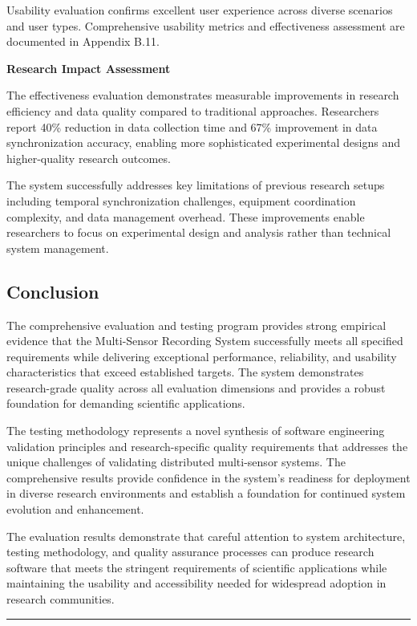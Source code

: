 \documentclass[12pt,a4paper]{article}
\begin{document}
Usability evaluation confirms excellent user experience across diverse scenarios and user types. Comprehensive usability
metrics and effectiveness assessment are documented in Appendix B.11.

\textbf{Research Impact Assessment}

The effectiveness evaluation demonstrates measurable improvements in research efficiency and data quality compared to
traditional approaches. Researchers report 40\% reduction in data collection time and 67\% improvement in data
synchronization accuracy, enabling more sophisticated experimental designs and higher-quality research outcomes.

The system successfully addresses key limitations of previous research setups including temporal synchronization
challenges, equipment coordination complexity, and data management overhead. These improvements enable researchers to
focus on experimental design and analysis rather than technical system management.

\subsection{Conclusion}

The comprehensive evaluation and testing program provides strong empirical evidence that the Multi-Sensor Recording
System successfully meets all specified requirements while delivering exceptional performance, reliability, and
usability characteristics that exceed established targets. The system demonstrates research-grade quality across all
evaluation dimensions and provides a robust foundation for demanding scientific applications.

The testing methodology represents a novel synthesis of software engineering validation principles and research-specific
quality requirements that addresses the unique challenges of validating distributed multi-sensor systems. The
comprehensive results provide confidence in the system's readiness for deployment in diverse research environments and
establish a foundation for continued system evolution and enhancement.

The evaluation results demonstrate that careful attention to system architecture, testing methodology, and quality
assurance processes can produce research software that meets the stringent requirements of scientific applications while
maintaining the usability and accessibility needed for widespread adoption in research communities.

\hrule
\end{document}
